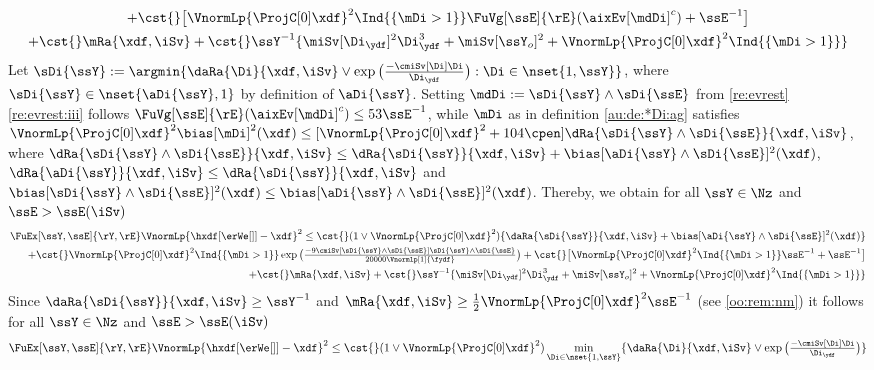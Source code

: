 \begin{pro}
\begin{multline}
    + \cst{}\big[
    \VnormLp{\ProjC[0]\xdf}^2\Ind{\{\mDi>1\}} \FuVg[\ssE]{\rE}(\aixEv[\mdDi]^c)+\ssE^{-1} \big]
    \\\hfill
    +\cst{}\mRa{\xdf,\iSv}
    +\cst{}\ssY^{-1}\{\miSv[\Di_{\ydf}]^2\Di_{\ydf}^3+\miSv[\ssY_{o}]^2+\VnormLp{\ProjC[0]\xdf}^2\Ind{\{\mDi>1\}}\}
\end{multline}
Let
$\sDi{\ssY}:=\argmin\{\daRa{\Di}{\xdf,\iSv}\vee\exp\big(\tfrac{-\cmiSv[\Di]\Di}{\Di_{\ydf}}\big):\Di\in\nset{1,\ssY}\}$,
where $\sDi{\ssY}\in\nset{\aDi{\ssY},1}$ by definition of
$\aDi{\ssY}$. Setting  
$\mdDi:=\sDi{\ssY}\wedge\sDi{\ssE}$ from
\cref{re:evrest} \ref{re:evrest:iii} follows
$\FuVg[\ssE]{\rE}(\aixEv[\mdDi]^c)\leq 53\ssE^{-1}$, while  $\mDi$ as in  definition
\eqref{au:de:*Di:ag} satisfies    $\VnormLp{\ProjC[0]\xdf}^2\bias[\mDi]^2(\xdf) \leq
  [\VnormLp{\ProjC[0]\xdf}^2+104\cpen]\dRa{\sDi{\ssY}\wedge\sDi{\ssE}}{\xdf,\iSv}$,
  where
  $\dRa{\sDi{\ssY}\wedge\sDi{\ssE}}{\xdf,\iSv}\leq\dRa{\sDi{\ssY}}{\xdf,\iSv}+\bias[\aDi{\ssY}\wedge\sDi{\ssE}]^2(\xdf)$, $\dRa{\aDi{\ssY}}{\xdf,\iSv}\leq\dRa{\sDi{\ssY}}{\xdf,\iSv}$
  and $\bias[\sDi{\ssY}\wedge\sDi{\ssE}]^2(\xdf)\leq
  \bias[\aDi{\ssY}\wedge\sDi{\ssE}]^2(\xdf)$. Thereby, we obtain for all $\ssY\in\Nz$ and $\ssE>\ssE(\iSv)$
 \begin{multline}\label{au:ag:ub:pnp:p12}
   \FuEx[\ssY,\ssE]{\rY,\rE}\VnormLp{\hxdf[{\erWe[]}]-\xdf}^2\leq\cst{}(1\vee\VnormLp{\ProjC[0]\xdf}^2)\{\daRa{\sDi{\ssY}}{\xdf,\iSv}+\bias[\aDi{\ssY}\wedge\sDi{\ssE}]^2(\xdf)\}\\\hfill
    +\cst{}\VnormLp{\ProjC[0]\xdf}^2\Ind{\{\mDi>1\}}
    \exp\big(\tfrac{-9\cmiSv[\sDi{\ssY}\wedge\sDi{\ssE}]\sDi{\ssY}\wedge\sDi{\ssE}}{20000\Vnormlp[1]{\fydf}}\big)
    + \cst{}\big[
    \VnormLp{\ProjC[0]\xdf}^2\Ind{\{\mDi>1\}}\ssE^{-1}+\ssE^{-1} \big]
    \\\hfill
    +\cst{}\mRa{\xdf,\iSv}
    +\cst{}\ssY^{-1}\{\miSv[\Di_{\ydf}]^2\Di_{\ydf}^3+\miSv[\ssY_{o}]^2+\VnormLp{\ProjC[0]\xdf}^2\Ind{\{\mDi>1\}}\}
\end{multline}
Since $\daRa{\sDi{\ssY}}{\xdf,\iSv}\geq\ssY^{-1}$ and
$\mRa{\xdf,\iSv}\geq\tfrac{1}{2}\VnormLp{\ProjC[0]\xdf}^2 \ssE^{-1}$
(see \cref{oo:rem:nm}) it follows  for all $\ssY\in\Nz$ and $\ssE>\ssE(\iSv)$
\begin{multline}\label{au:ag:ub:pnp:p13}
  \FuEx[\ssY,\ssE]{\rY,\rE}\VnormLp{\hxdf[{\erWe[]}]-\xdf}^2\leq\cst{}(1\vee\VnormLp{\ProjC[0]\xdf}^2)\min_{\Di\in\nset{1,\ssY}}\{\daRa{\Di}{\xdf,\iSv}\vee\exp\big(\tfrac{-\cmiSv[\Di]\Di}{\Di_{\ydf}}\big)\}\\\hfill

\end{multline}
\end{pro}
